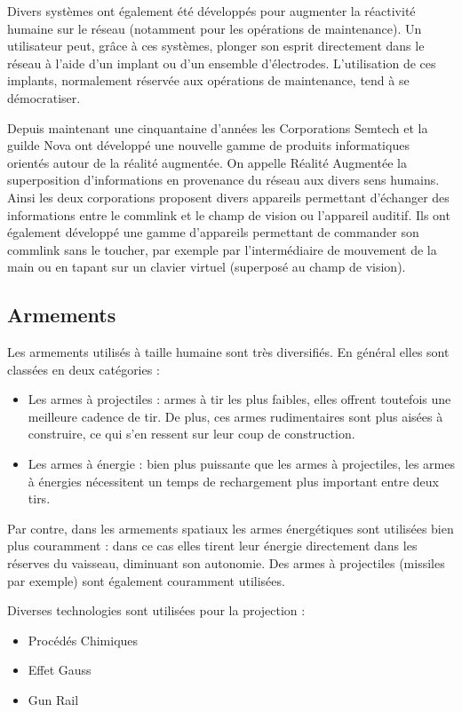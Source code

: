 \begin{multicols}{2}
Divers systèmes ont également été développés pour augmenter la réactivité humaine sur le réseau (notamment pour les opérations de maintenance). Un utilisateur peut, grâce à ces systèmes, plonger son esprit directement dans le réseau à l’aide d’un implant ou d’un ensemble d’électrodes. L’utilisation de ces implants, normalement réservée aux opérations de maintenance, tend à se démocratiser. 

Depuis maintenant une cinquantaine d’années les Corporations Semtech et la guilde Nova ont développé une nouvelle gamme de produits informatiques orientés autour de la réalité augmentée. On appelle Réalité Augmentée la superposition d’informations en provenance du réseau aux divers sens humains. Ainsi les deux corporations proposent divers appareils permettant d’échanger des informations entre le commlink et le champ de vision ou l’appareil auditif. Ils ont également développé une gamme d’appareils permettant de commander son commlink sans le toucher, par exemple par l’intermédiaire de mouvement de la main ou en tapant sur un clavier virtuel (superposé au champ de vision).

\subsection{Armements}

Les armements utilisés à taille humaine sont très diversifiés. En général elles sont classées en deux catégories :

\begin{itemize}
	\item Les armes à projectiles : armes à tir les plus faibles, elles offrent toutefois une meilleure cadence de tir. De plus, ces armes rudimentaires sont plus aisées à construire, ce qui s’en ressent sur leur coup de construction.
	\item Les armes à énergie : bien plus puissante que les armes à projectiles, les armes à énergies nécessitent un temps de rechargement plus important entre deux tirs.
\end{itemize}

Par contre, dans les armements spatiaux les armes énergétiques sont utilisées bien plus couramment : dans ce cas elles tirent leur énergie directement dans les réserves du vaisseau, diminuant son autonomie. Des armes à projectiles (missiles par exemple) sont également couramment utilisées. 

Diverses technologies sont utilisées pour la projection :
\begin{itemize}
	\item Procédés Chimiques
	\item Effet Gauss
	\item Gun Rail
\end{itemize}


\end{multicols}
